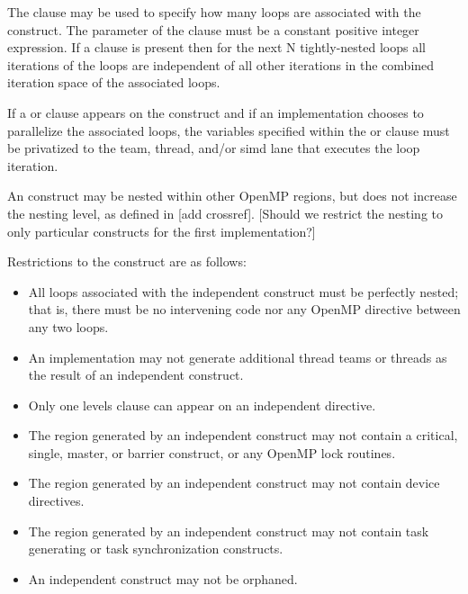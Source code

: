 The  clause may be used to specify how many loops are associated with the
 construct. The parameter of the  clause must be
a constant positive integer expression. If a  clause is present then for the next N
tightly-nested loops all iterations of the loops are independent of all other
iterations in the combined iteration space of the associated loops. 

If a  or  clause appears on the
 construct and if
an implementation chooses to parallelize the associated loops, the variables
specified within the  or  clause must be privatized to the team, thread,
and/or simd lane that executes the loop iteration.

An  construct may be nested within other OpenMP regions, but does
not increase the nesting level, as defined in [add crossref]. [Should we
restrict the nesting to only particular constructs for the first
implementation?]

\restrictions
Restrictions to the  construct are as follows:

\begin{itemize}
  \item All loops associated with the independent construct must be perfectly
    nested; that is, there must be no intervening code nor any OpenMP directive
    between any two loops.
    
  \item An implementation may not generate additional thread teams or threads
    as the result of an independent construct.

  \item Only one levels clause can appear on an independent directive.
  
  \item The region generated by an independent construct may not contain a
    critical, single, master, or barrier construct, or any OpenMP lock
    routines.
  
  \item The region generated by an independent construct may not contain device
    directives.
    
  \item The region generated by an independent construct may not contain task
    generating or task synchronization constructs.
    
  \item An independent construct may not be orphaned.

\end{itemize}

